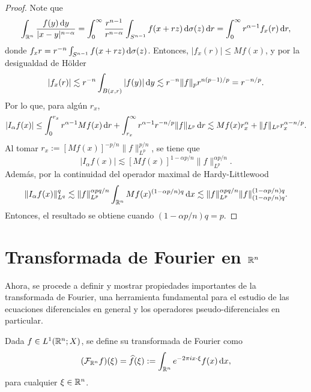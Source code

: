 \begin{proof}
	Note que 
	\begin{equation*}
		\int_{\mathbb{R}^n} \frac{f(y)\mathop{}\!\mathrm{d} y}{|x-y|^{n-\alpha}} = \int_0^\infty \frac{r^{n-1}}{r^{n-\alpha}}  \int_{S^{n-1}} f(x+rz) \mathop{}\!\mathrm{d} \sigma(z) \mathop{}\!\mathrm{d} r = \int_0^\infty r^{\alpha-1} f_x(r)\mathop{}\!\mathrm{d} r,
	\end{equation*}
	donde $f_xr = r^{-n} \int_{S^{n-1}} f(x+rz) \mathop{}\!\mathrm{d} \sigma(z) $. Entonces, $|f_x(r)| \leq Mf(x)$, y por la desigualdad de Hölder
	\begin{equation*}
		|f_x(r)| \lesssim r^{-n}\int_{B(x, r)}| f(y)|\mathop{}\!\mathrm{d} y \lesssim r^{-n}\|f\|_p r^{n(p-1)/p}  = r^{-n/p}.
	\end{equation*}
	Por lo que, para algún $r_x$,
	\begin{equation*}
		|I_\alpha f(x) |\leq \int_0^{r_x} r^{\alpha-1} Mf(x)\mathop{}\!\mathrm{d} r + \int_{r_x}^\infty r^{\alpha-1}r^{-n/p} \|f\|_{L^p}\mathop{}\!\mathrm{d} r \lesssim Mf(x)r_x^{\alpha} + \|f\|_{L^p}r_x^{\alpha-n/p}.
	\end{equation*}
	Al tomar $r_x := [Mf(x)]^{-p/n}\|f\|_{L^p}^{p/n}$, se tiene que 
	\begin{equation*}
		|I_\alpha f(x) |\lesssim [Mf(x)]^{1 -\alpha p/n} \|f\|_{L^p}^{\alpha p/n}.
	\end{equation*}
	Además, por la continuidad del operador maximal de Hardy-Littlewood
	\begin{equation*}
		\|I_\alpha f(x) \|_{L^q}^q \lesssim \|f\|_{L^p}^{\alpha pq/n} \int_{\mathbb{R}^n}Mf(x)^{(1 -\alpha p/n)q}\mathop{}\!\mathrm{d} x \lesssim  \|f\|_{L^p}^{\alpha pq/n} \|f\|_{(1 -\alpha p/n)q}^{(1 -\alpha p/n)q}.
	\end{equation*}
	Entonces, el resultado se obtiene cuando $(1 -\alpha p/n)q = p$.
\end{proof}
\section{Transformada de Fourier en $\mathbb{R}^n$}
Ahora, se procede a definir y mostrar propiedades importantes de la
transformada de Fourier, una herramienta fundamental para el estudio
de las ecuaciones diferenciales en general y los operadores
pseudo-diferenciales en particular. 

\begin{definition}
    Dada $f\in L^1(\mathbb{R}^n;X)$, se define su transformada de Fourier como 
    \begin{equation*}
        (\mathcal{F}_{\mathbb{R}^n}f)(\xi) = \widehat{f}(\xi) := \int_{\mathbb{R}^n}
        e^{-2\pi i x \cdot \xi} f(x) \mathop{}\!\mathrm{d} x,
    \end{equation*}
    para cualquier $\xi \in \mathbb{R}^n$.
\end{definition}

